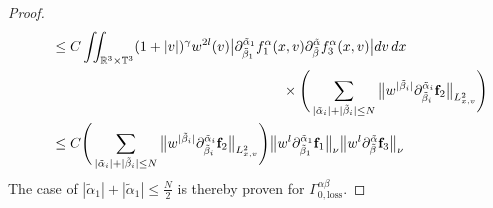\documentclass[reqno]{amsart}
\numberwithin{equation}{section}
\numberwithin{equation}{section}
\begin{document}
\begin{proof}
\begin{align*}
			& \hspace{0.5cm} \leq C \iint_{\mathbb{R}^3\times\mathbb{T}^3} (1 + |v|)^\gamma w^{2l}(v) \big|\partial_{\tilde{\beta}_1}^{\tilde{\alpha}_1}f^{\alpha}_1 (x,v) \partial_{\tilde{\beta}}^{\tilde{\alpha}}f^{\alpha}_3 (x,v)\big|dv\, dx\\
			& \hspace{6.3cm}\times \Bigg(\sum_{|\tilde{\alpha}_i|+|\tilde{\beta}_i|\leq N}\big\Vert w^{|\tilde{\beta}_i|}\partial_{\tilde{\beta}_i}^{\tilde{\alpha}_i}\mathbf{f}_2\big\Vert_{L^{2}_{x,v}} \Bigg)\\
			& \hspace{0.5cm} \leq C \Bigg(\sum_{|\tilde{\alpha}_i|+|\tilde{\beta}_i|\leq N}\big\Vert w^{|\tilde{\beta}_i|}\partial_{\tilde{\beta}_i}^{\tilde{\alpha}_i}\mathbf{f}_2\big\Vert_{L^{2}_{x,v}} \Bigg)\big\Vert w^{l}\partial_{\tilde{\beta}_1}^{\tilde{\alpha}_1}\mathbf{f}_1\big\Vert_{\nu} \big\Vert w^{l}\partial_{\tilde{\beta}}^{\tilde{\alpha}}\mathbf{f}_3\big\Vert_{\nu}
		\end{align*}
		The case of $|\tilde{\alpha}_1|+|\tilde{\alpha}_1|\leq \frac{N}{2}$ is thereby proven for $\Gamma_{0,\text{loss}}^{\alpha \beta}$.
		

\end{proof}
\end{document}
